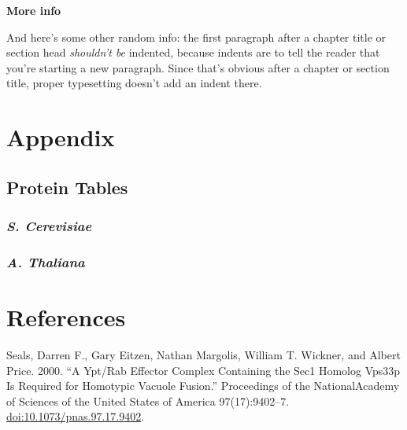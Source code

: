 \documentclass[12pt,twoside]{reedthesis}
\begin{document}
\textbf{More info}

And here's some other random info: the first paragraph after a chapter title or section head \emph{shouldn't be} indented, because indents are to tell the reader that you're starting a new paragraph. Since that's obvious after a chapter or section title, proper typesetting doesn't add an indent there.

\chapter*{Appendix}\label{appendix}

\section*{Protein Tables}\label{protein-tables}

\subsection*{\texorpdfstring{\emph{S. Cerevisiae}}{S. Cerevisiae}}\label{s.-cerevisiae}

\subsection*{\texorpdfstring{\emph{A. Thaliana}}{A. Thaliana}}\label{a.-thaliana}

\backmatter

\chapter*{References}\label{references}


\noindent 

\setlength{\parindent}{-0.20in}

Seals, Darren F., Gary Eitzen, Nathan Margolis, William T. Wickner, and Albert Price. 2000. ``A Ypt/Rab Effector Complex Containing the Sec1 Homolog Vps33p Is Required for Homotypic Vacuole Fusion.'' Proceedings of the NationalAcademy of Sciences of the United States of America 97(17):9402--7. \url{doi:10.1073/pnas.97.17.9402}.
\end{document}
